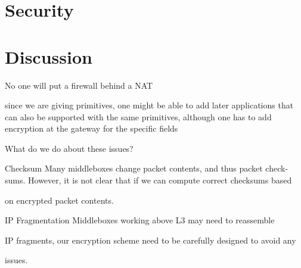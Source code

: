 

\section{Security}

\section{Discussion}

No one will put a firewall behind a NAT

since we are giving primitives, one might be able to add later applications that can also be supported with the same primitives, although one has to add encryption at the gateway for the specific fields 

What do we do about these issues?

Checksum Many middleboxes change packet contents, and thus packet check-
sums. However, it is not clear that if we can compute correct checksums based

on encrypted packet contents.

IP Fragmentation Middleboxes working above L3 may need to reassemble

IP fragments, our encryption scheme need to be carefully designed to avoid any

issues.
